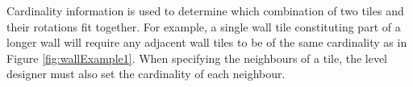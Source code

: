 Cardinality information is used to determine which combination of two tiles and their rotations fit together. For example, a single wall tile constituting part of a longer wall will require any adjacent wall tiles to be of the same cardinality as in Figure \ref{fig:wallExample1}. When specifying the neighbours of a tile, the level designer must also set the cardinality of each neighbour.

\begin{figure}[H]
    \centering

    \vspace{\baselineskip} %


\end{figure}
